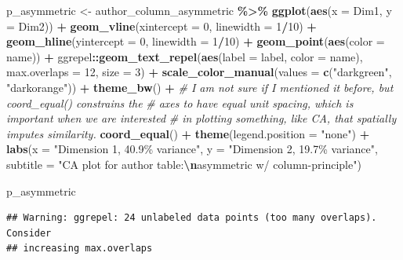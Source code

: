 \documentclass[
]{book}
\newenvironment{Shaded}{\begin{snugshade}}{\end{snugshade}}
\newcommand{\AttributeTok}[1]{\textcolor[rgb]{0.13,0.29,0.53}{#1}}
\newcommand{\CommentTok}[1]{\textcolor[rgb]{0.56,0.35,0.01}{\textit{#1}}}
\newcommand{\DecValTok}[1]{\textcolor[rgb]{0.00,0.00,0.81}{#1}}
\newcommand{\FunctionTok}[1]{\textcolor[rgb]{0.13,0.29,0.53}{\textbf{#1}}}
\newcommand{\NormalTok}[1]{#1}
\newcommand{\OtherTok}[1]{\textcolor[rgb]{0.56,0.35,0.01}{#1}}
\newcommand{\SpecialCharTok}[1]{\textcolor[rgb]{0.81,0.36,0.00}{\textbf{#1}}}
\newcommand{\StringTok}[1]{\textcolor[rgb]{0.31,0.60,0.02}{#1}}
\begin{document}
\begin{Shaded}
\begin{Highlighting}[]
\NormalTok{p\_asymmetric }\OtherTok{\textless{}{-}} 
\NormalTok{  author\_column\_asymmetric }\SpecialCharTok{\%\textgreater{}\%}
  \FunctionTok{ggplot}\NormalTok{(}\FunctionTok{aes}\NormalTok{(}\AttributeTok{x =}\NormalTok{ Dim1, }\AttributeTok{y =}\NormalTok{ Dim2)) }\SpecialCharTok{+} 
  \FunctionTok{geom\_vline}\NormalTok{(}\AttributeTok{xintercept =} \DecValTok{0}\NormalTok{, }\AttributeTok{linewidth =} \DecValTok{1}\SpecialCharTok{/}\DecValTok{10}\NormalTok{) }\SpecialCharTok{+} 
  \FunctionTok{geom\_hline}\NormalTok{(}\AttributeTok{yintercept =} \DecValTok{0}\NormalTok{, }\AttributeTok{linewidth =} \DecValTok{1}\SpecialCharTok{/}\DecValTok{10}\NormalTok{) }\SpecialCharTok{+}
  \FunctionTok{geom\_point}\NormalTok{(}\FunctionTok{aes}\NormalTok{(}\AttributeTok{color =}\NormalTok{ name)) }\SpecialCharTok{+} 
\NormalTok{  ggrepel}\SpecialCharTok{::}\FunctionTok{geom\_text\_repel}\NormalTok{(}\FunctionTok{aes}\NormalTok{(}\AttributeTok{label =}\NormalTok{ label, }\AttributeTok{color =}\NormalTok{ name),}
                           \AttributeTok{max.overlaps =} \DecValTok{12}\NormalTok{, }\AttributeTok{size =} \DecValTok{3}\NormalTok{) }\SpecialCharTok{+}
  \FunctionTok{scale\_color\_manual}\NormalTok{(}\AttributeTok{values =} \FunctionTok{c}\NormalTok{(}\StringTok{"darkgreen"}\NormalTok{, }\StringTok{"darkorange"}\NormalTok{)) }\SpecialCharTok{+}
  \FunctionTok{theme\_bw}\NormalTok{() }\SpecialCharTok{+} 
  \CommentTok{\# I am not sure if I mentioned it before, but \textasciigrave{}coord\_equal()\textasciigrave{} constrains the}
  \CommentTok{\# axes to have equal unit spacing, which is important when we are interested}
  \CommentTok{\# in plotting something, like CA, that spatially imputes similarity.}
  \FunctionTok{coord\_equal}\NormalTok{() }\SpecialCharTok{+}
  \FunctionTok{theme}\NormalTok{(}\AttributeTok{legend.position =} \StringTok{"none"}\NormalTok{) }\SpecialCharTok{+}
  \FunctionTok{labs}\NormalTok{(}\AttributeTok{x =} \StringTok{"Dimension 1, 40.9\% variance"}\NormalTok{,}
       \AttributeTok{y =} \StringTok{"Dimension 2, 19.7\% variance"}\NormalTok{,}
       \AttributeTok{subtitle =} \StringTok{"CA plot for \textasciigrave{}author\textasciigrave{} table:}\SpecialCharTok{\textbackslash{}n}\StringTok{asymmetric w/ column{-}principle"}\NormalTok{)}

\NormalTok{p\_asymmetric}
\end{Highlighting}
\end{Shaded}

\begin{verbatim}
## Warning: ggrepel: 24 unlabeled data points (too many overlaps). Consider
## increasing max.overlaps
\end{verbatim}
\end{document}

